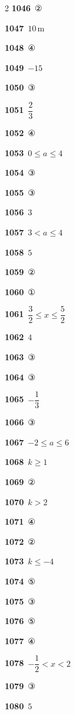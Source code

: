 \documentclass[10pt,a4paper]{article}
\begin{document}
\begin{multicols}{2}
\noindent\textbf{1046}\ ②\par
\noindent\textbf{1047}\ $10\,\mathrm{m}$\par
\noindent\textbf{1048}\ ④\par
\noindent\textbf{1049}\ $-15$\par
\noindent\textbf{1050}\ ③\par
\noindent\textbf{1051}\ $\dfrac{2}{3}$\par
\noindent\textbf{1052}\ ④\par
\noindent\textbf{1053}\ $0\le a\le 4$\par
\noindent\textbf{1054}\ ③\par
\noindent\textbf{1055}\ ③\par
\noindent\textbf{1056}\ $3$\par
\noindent\textbf{1057}\ $3<a\le 4$\par
\noindent\textbf{1058}\ $5$\par
\noindent\textbf{1059}\ ②\par
\noindent\textbf{1060}\ ①\par
\noindent\textbf{1061}\ $\dfrac{3}{2}\le x\le \dfrac{5}{2}$\par
\noindent\textbf{1062}\ $4$\par
\noindent\textbf{1063}\ ③\par
\noindent\textbf{1064}\ ③\par
\noindent\textbf{1065}\ $-\dfrac{1}{3}$\par
\noindent\textbf{1066}\ ③\par
\noindent\textbf{1067}\ $-2\le a\le 6$\par
\noindent\textbf{1068}\ $k\ge 1$\par
\noindent\textbf{1069}\ ②\par
\noindent\textbf{1070}\ $k>2$\par
\noindent\textbf{1071}\ ④\par
\noindent\textbf{1072}\ ②\par
\noindent\textbf{1073}\ $k\le -4$\par
\noindent\textbf{1074}\ ⑤\par
\noindent\textbf{1075}\ ③\par
\noindent\textbf{1076}\ ⑤\par
\noindent\textbf{1077}\ ④\par
\noindent\textbf{1078}\ $-\dfrac{1}{2}<x<2$\par
\noindent\textbf{1079}\ ③\par
\noindent\textbf{1080}\ $5$\par

\end{multicols}
\end{document}
